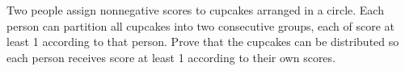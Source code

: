 Two people assign nonnegative scores to cupcakes arranged in a circle. Each person can partition all cupcakes into two consecutive groups, each of score at least 1 according to that person. Prove that the cupcakes can be distributed so each person receives score at least 1 according to their own scores.
